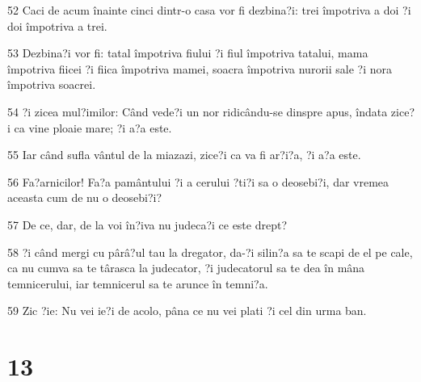 \par 52 Caci de acum înainte cinci dintr-o casa vor fi dezbina?i: trei împotriva a doi ?i doi împotriva a trei.
\par 53 Dezbina?i vor fi: tatal împotriva fiului ?i fiul împotriva tatalui, mama împotriva fiicei ?i fiica împotriva mamei, soacra împotriva nurorii sale ?i nora împotriva soacrei.
\par 54 ?i zicea mul?imilor: Când vede?i un nor ridicându-se dinspre apus, îndata zice?i ca vine ploaie mare; ?i a?a este.
\par 55 Iar când sufla vântul de la miazazi, zice?i ca va fi ar?i?a, ?i a?a este.
\par 56 Fa?arnicilor! Fa?a pamântului ?i a cerului ?ti?i sa o deosebi?i, dar vremea aceasta cum de nu o deosebi?i?
\par 57 De ce, dar, de la voi în?iva nu judeca?i ce este drept?
\par 58 ?i când mergi cu pârâ?ul tau la dregator, da-?i silin?a sa te scapi de el pe cale, ca nu cumva sa te târasca la judecator, ?i judecatorul sa te dea în mâna temnicerului, iar temnicerul sa te arunce în temni?a.
\par 59 Zic ?ie: Nu vei ie?i de acolo, pâna ce nu vei plati ?i cel din urma ban.

\chapter{13}

